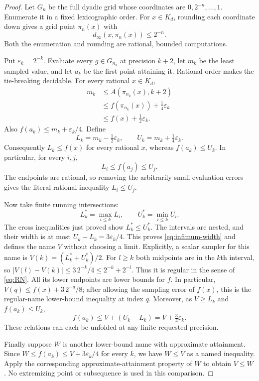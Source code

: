 \begin{proof}
Let $G_n$ be the full dyadic grid whose coordinates are
$0,2^{-n},\ldots,1$.  Enumerate it in a fixed lexicographic order.
For $x\in K_d$, rounding each coordinate down gives a grid point
$\pi_n(x)$ with
\[
 d_\infty(x,\pi_n(x))\le2^{-n}.
\]
Both the enumeration and rounding are rational, bounded computations.

Put $\varepsilon_k=2^{-k}$.  Evaluate every $g\in G_{n_k}$ at
precision $k+2$, let $m_k$ be the least sampled value, and let $a_k$ be
the first point attaining it.  Rational order makes the tie-breaking
decidable.  For every rational $x\in K_d$,
\begin{align*}
 m_k
 &\le A(\pi_{n_k}(x),k+2)\\
 &\le f(\pi_{n_k}(x))+\tfrac14\varepsilon_k\\
 &\le f(x)+\tfrac12\varepsilon_k.
\end{align*}
Also
$f(a_k)\le m_k+\varepsilon_k/4$.
Define
\[
 L_k=m_k-\tfrac12\varepsilon_k,
 \qquad U_k=m_k+\tfrac14\varepsilon_k.
\]
Consequently $L_k\le f(x)$ for every rational $x$, whereas
$f(a_k)\le U_k$.  In particular, for every $i,j$,
\[
 L_i\le f(a_j)\le U_j.
\]
The endpoints are rational, so removing the arbitrarily small evaluation
errors gives the literal rational inequality $L_i\le U_j$.

Now take finite running intersections:
\[
 L^*_k=\max_{i\le k}L_i,
 \qquad U^*_k=\min_{i\le k}U_i.
\]
The cross inequalities just proved show $L^*_k\le U^*_k$.  The
intervals are nested, and their width is at most
$U_k-L_k=3\varepsilon_k/4$.  This proves
\eqref{eq:infimum-width} and defines the name $V$ without choosing a
limit. Explicitly, a scalar sampler for this name is
$V(k)=(L^*_k+U^*_k)/2$. For $l\ge k$ both midpoints are in the
$k$th interval, so $|V(l)-V(k)|\le3\,2^{-k}/4\le2^{-k}+2^{-l}$.
Thus it is regular in the sense of \eqref{eq:RN}.
All its lower endpoints are lower bounds for $f$. In particular,
$V(q)\le f(x)+3\,2^{-q}/8$; after allowing the sampling error of
$f(x)$, this is the regular-name lower-bound inequality at index $q$.
Moreover,
as $V\ge L_k$ and $f(a_k)\le U_k$,
\[
 f(a_k)\le V+(U_k-L_k)
          =V+\tfrac34\varepsilon_k.
\]
These relations can each be unfolded at any finite requested precision.

Finally suppose $W$ is another lower-bound name with approximate
attainment.  Since $W\le f(a_k)\le V+3\varepsilon_k/4$ for every
$k$, we have $W\le V$ as a named inequality.  Apply the corresponding
approximate-attainment property of $W$ to obtain $V\le W$.  No
extremizing point or subsequence is used in this comparison.
\end{proof}

